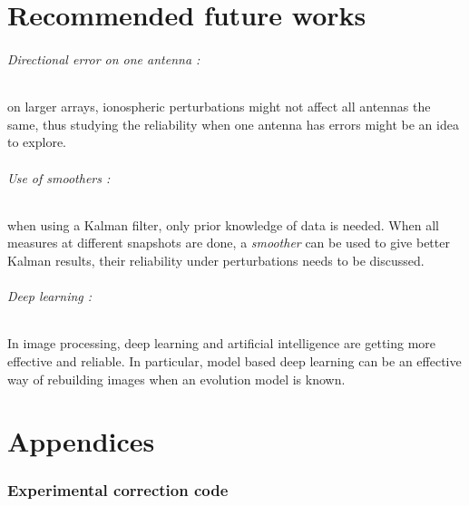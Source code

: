 \documentclass[titlepage]{article}
\begin{document}
	\newpage
	\part{Recommended future works}
	
	
	\paragraph{Directional error on one antenna :} on larger arrays, ionospheric perturbations might not affect all antennas the same, thus studying the reliability when one antenna has errors might be an idea to explore.
	
	\paragraph{Use of smoothers :} when using a Kalman filter, only prior knowledge of data is needed. When all measures at different snapshots are done, a \emph{smoother}\cite{RTS} can be used to give better Kalman results, their reliability under perturbations needs to be discussed. 
	
	\paragraph{Deep learning :} In image processing, deep learning and artificial intelligence are getting more effective and reliable. In particular, model based deep learning \cite{deep} can be an effective way of rebuilding images when an evolution model is known.
	
	\newpage
	\part{Appendices}
	\section{Experimental correction code}
	
\end{document}
